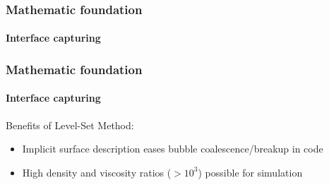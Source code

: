 \documentclass[ucs]{beamer}
\begin{document}
\begin{frame}
\frametitle{Mathematic foundation}
\framesubtitle{Interface capturing}
\end{frame}

\begin{frame}
\frametitle{Mathematic foundation}
\framesubtitle{Interface capturing}
Benefits of Level-Set Method:
\begin{itemize}
\item<2-> Implicit surface description eases bubble coalescence/breakup in code
\item<3-> High density and viscosity ratios ($>10^3$) possible for simulation
\end{itemize}
\end{frame}
\end{document}
